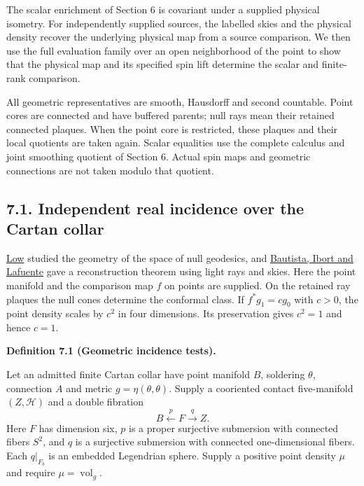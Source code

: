 \documentclass[
  english,
  11pt,
  reqno]{amsart}
\makeatletter
\newcommand{\pandocstatementheading}[1]{%
  \par\if@nobreak\else
    \addpenalty{\@beginparpenalty}%
    \addvspace{.5\baselineskip plus .2\baselineskip minus .2\baselineskip}%
  \fi
  {\normalfont\bfseries #1\par}%
  \nobreak\@afterindenttrue\@afterheading
}
\makeatother
\begin{document}
The scalar enrichment of Section 6 is covariant under a supplied
physical isometry. For independently supplied sources, the labelled
skies and the physical density recover the underlying physical map from
a source comparison. We then use the full evaluation family over an open
neighborhood of the point to show that the physical map and its
specified spin lift determine the scalar and finite-rank comparison.

All geometric representatives are smooth, Hausdorff and second
countable. Point cores are connected and have buffered parents; null
rays mean their retained connected plaques. When the point core is
restricted, these plaques and their local quotients are taken again.
Scalar equalities use the complete calculus and joint smoothing quotient
of Section 6. Actual spin maps and geometric connections are not taken
modulo that quotient.

\subsection{7.1. Independent real incidence over the Cartan
collar}\label{independent-real-incidence-over-the-cartan-collar}\label{sec:online-actual-incidence-admission}

\hyperref[ref-Low2001]{Low} studied the geometry of the space of null
geodesics, and \hyperref[ref-BautistaIbortLafuente2014]{Bautista, Ibort
and Lafuente} gave a reconstruction theorem using light rays and skies.
Here the point manifold and the comparison map \(f\) on points are
supplied. On the retained ray plaques the null cones determine the
conformal class. If \(f^*g_1=cg_0\) with \(c>0\), the point density
scales by \(c^2\) in four dimensions. Its preservation gives \(c^2=1\)
and hence \(c=1\).

\pandocstatementheading{\leavevmode{}\label{def:online-complete-geometric-incidence}Definition 7.1 (Geometric incidence tests).}

Let an admitted finite Cartan collar have point manifold \(B\),
soldering \(\theta\), connection \(A\) and metric
\(g=\eta(\theta,\theta)\). Supply a cooriented contact five-manifold
\((Z,\mathcal H)\) and a double fibration%
 \[
B\xleftarrow{\ p\ }F\xrightarrow{\ q\ }Z.
\] Here \(F\) has dimension six, \(p\) is a proper surjective submersion
with connected fibers \(S^2\), and \(q\) is a surjective submersion with
connected one-dimensional fibers. Each \(q|_{F_b}\) is an embedded
Legendrian sphere. Supply a positive point density \(\mu\) and require
\(\mu=\operatorname{vol}_g\).
\end{document}
